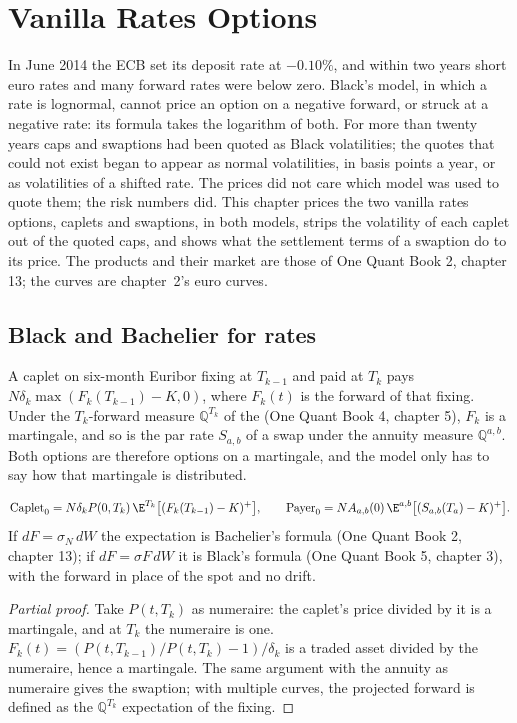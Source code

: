 \chapter{Vanilla Rates Options}\label{ch:rc:vanilla-rates-options}

In June 2014 the ECB set its deposit rate at $-0.10\%$, and within two years
short euro rates and many forward rates were below zero. Black's model, in
which a rate is lognormal, cannot price an option on a negative forward, or
struck at a negative rate: its formula takes the logarithm of both. For more
than twenty years caps and swaptions had been quoted as Black volatilities; the
quotes that could not exist began to appear as normal volatilities, in basis
points a year, or as volatilities of a shifted rate. The prices did not care
which model was used to quote them; the risk numbers did. This chapter prices
the two vanilla rates options, caplets and swaptions, in both models, strips
the volatility of each caplet out of the quoted caps, and shows what the
settlement terms of a swaption do to its price. The products and their
market are those of One Quant Book 2, chapter 13; the curves are chapter~2's
euro curves.

\section{Black and Bachelier for rates}

A caplet on six-month Euribor fixing at $T_{k-1}$ and paid at $T_k$ pays
$N\delta_k\max(F_k(T_{k-1})-K,0)$, where $F_k(t)$ is the forward of that fixing.
Under the $T_k$-forward measure $\mathbb Q^{T_k}$ of the  (One
Quant Book 4, chapter 5), $F_k$ is a martingale, and so is the par rate
$S_{a,b}$ of a swap under the annuity measure $\mathbb Q^{a,b}$. Both options are
therefore options on a martingale, and the model only has to say how that
martingale is distributed.

\begin{proposition}\label{prop:rc:vanilla-rates-options:measures}
\[
\mathrm{Caplet}_0 = N\delta_kP(0,T_k)\,\E^{T_k}\bigl[(F_k(T_{k-1})-K)^+\bigr],
\qquad
\mathrm{Payer}_0 = N A_{a,b}(0)\,\E^{a,b}\bigl[(S_{a,b}(T_a)-K)^+\bigr].
\]
If $dF = \sigma_N\,dW$ the expectation is Bachelier's formula (One Quant Book 2,
chapter 13); if $dF = \sigma F\,dW$ it is Black's formula (One Quant Book 5,
chapter 3), with the forward in place of the spot and no drift.
\end{proposition}
\begin{proof}[Partial proof]
Take $P(t,T_k)$ as numeraire: the caplet's price divided by it is a martingale,
and at $T_k$ the numeraire is one. $F_k(t) = (P(t,T_{k-1})/P(t,T_k)-1)/\delta_k$
is a traded asset divided by the numeraire, hence a martingale. The same
argument with the annuity as numeraire gives the swaption; with multiple curves,
the projected forward is defined as the $\mathbb Q^{T_k}$ expectation of the
fixing.
\end{proof}

